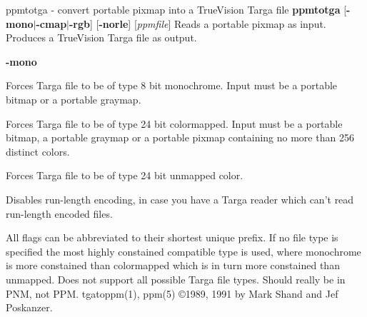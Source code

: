 %

\newpage
%

ppmtotga - convert portable pixmap into a TrueVision Targa file
{\bf ppmtotga}
{\rm [}{\bf -mono$|$-cmap$|$-rgb}{\rm ]}
{\rm [}{\bf -norle}{\rm ]}
{\rm [}{\it ppmfile}{\rm ]}
Reads a portable pixmap as input.
Produces a TrueVision Targa file as output.
\begin{TPlist}{{\bf -mono}}
\item[{{\bf -mono}}]
Forces Targa file to be of type 8 bit monochrome.  Input must be a portable
bitmap or a portable graymap.
\item[{{\bf -cmap}}]
Forces Targa file to be of type 24 bit colormapped.  Input must be a portable
bitmap, a portable graymap or a portable pixmap containing no more than
256 distinct colors.
\item[{{\bf -rgb}}]
Forces Targa file to be of type 24 bit unmapped color.
\item[{{\bf -norle}}]
Disables run-length encoding, in case you have a Targa reader which
can't read run-length encoded files.
\end{TPlist}

\par
All flags can be abbreviated to their shortest unique prefix.  If no
file type is specified the most highly constained compatible type is
used, where monochrome is more constained than colormapped which is in
turn more constained than unmapped.
Does not support all possible Targa file types.
Should really be in PNM, not PPM.
tgatoppm(1), ppm(5)
\copyright 1989, 1991 by Mark Shand and Jef Poskanzer.
%
 
